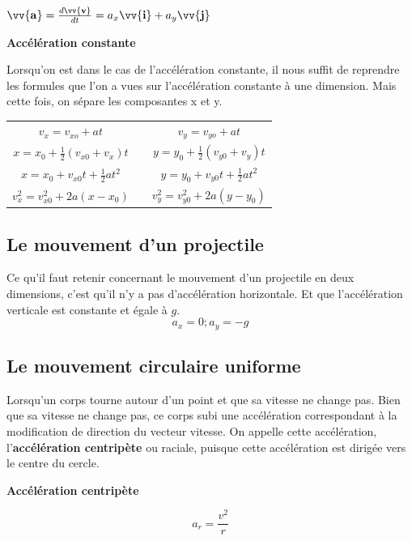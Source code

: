 \documentclass{article}
\begin{document}
\newline

$\vv{\mathbf{a}} = \frac{d\vv{\mathbf{v}}}{dt} = a_x\vv{\mathbf{i}} + a_y\vv{\mathbf{j}}$
\newline

\noindent
\textbf{Accélération constante}
\newline

Lorsqu'on est dans le cas de l'accélération constante, il nous suffit de reprendre les formules que l'on a vues sur l'accélération constante à une dimension. Mais cette fois, on sépare les composantes x et y.

\begin{center}
\begin{tabular}{ c c c }
$v_x = v_{xo} + at$                    &   & $v_y = v_{yo} + at$ \\
$x = x_0 + \frac{1}{2}(v_{x0} + v_x)t$ &   & $y = y_0 + \frac{1}{2}(v_{y0} + v_y)t$ \\
$x = x_0 + v_{x0}t + \frac{1}{2}at^2$  &   & $y = y_0 + v_{y0}t + \frac{1}{2}at^2$ \\
$v^2_x = v^2_{x0} + 2a(x - x_0)$       &   & $v^2_y = v^2_{y0} + 2a(y - y_0)$ 
\end{tabular}
\end{center}

\subsection{Le mouvement d'un projectile}
Ce qu'il faut retenir concernant le mouvement d'un projectile en deux dimensions, c'est qu'il n'y a pas d'accélération horizontale. Et que l'accélération verticale est constante et égale à $g$.
\[a_x = 0; a_y = -g\]

\subsection{Le mouvement circulaire uniforme}
Lorsqu'un corps tourne autour d'un point et que sa vitesse ne change pas. Bien que sa vitesse ne change pas, ce corps subi une accélération correspondant à la modification de direction du vecteur vitesse. On appelle cette accélération, l'\textbf{accélération centripète} ou raciale, puisque cette accélération est dirigée vers le centre du cercle.
\newline

\noindent
\textbf{Accélération centripète}

\[a_r = \frac{v^2}{r}\]
\end{document}
